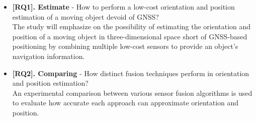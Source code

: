 \begin{itemize}
      \item \textbf{[RQ1]. Estimate} - How to perform a low-cost orientation and position estimation of a moving object devoid of GNSS?\\
            The study will emphasize on the possibility of estimating the orientation and position of a moving object in three-dimensional space short of GNSS-based positioning by combining multiple low-cost sensors to provide an object's navigation information.
      \item \textbf{[RQ2]. Comparing} - How distinct fusion techniques perform in orientation and position estimation? \\
            An experimental comparison between various sensor fusion algorithms is used to evaluate how accurate each approach can approximate orientation and position.

\end{itemize}
